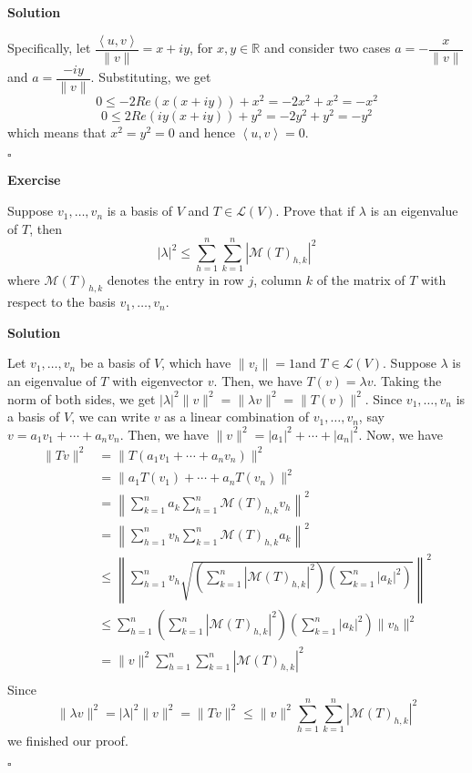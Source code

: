 \documentclass{article}
\newenvironment{exercise}{%
{\textbf{Exercise\\}
    }
}{
}
\newenvironment{solution}{%
{
    \textbf{Solution\\}
    }
}{
  \hfill $\square$ 
  \par\bigskip 
}
\newcommand{\RR}{\mathbb{R}}
\newcommand{\parameter}[1]{\left(#1\right)}
\begin{document}
\begin{CJK}{UTF8}{gkai}
\begin{solution}
    Specifically, let $\dfrac{\left<u,v\right>}{\|v\|}=x+iy$, for $x,y\in \RR$ and consider two cases $a=-\dfrac{x}{\|v\|}$ and $a = \dfrac{-iy}{\|v\|}$. Substituting, we get  
   \[0\leq -2Re(x(x+iy))+x^2=-2x^2+x^2=-x^2\]
   \[0\leq 2Re(iy(x+iy))+y^2=-2y^2+y^2=-y^2\]
    which means that $x^2=y^2=0$ and hence $\left<u,v\right>=0$.
\end{solution}

\begin{exercise}
    Suppose $v_1,\ldots,v_n$ is a basis of $V$ and $T \in \mathcal{L}(V)$. Prove that if $\lambda$ is an eigenvalue of $T$, then
    \[|\lambda|^2 \leq \sum_{h = 1}^{n}\sum_{k = 1}^{n}|\mathcal{M}(T)_{h,k}|^2\]
    where $\mathcal{M}(T)_{h,k}$ denotes the entry in row $j$, column $k$ of the matrix of $T$ with respect to the basis $v_1,\ldots,v_n$.
\end{exercise}

\begin{solution}
    Let $v_1,\ldots,v_n$ be a basis of $V$, which have $\|v_i\| = 1$and $T \in \mathcal{L}(V)$. Suppose $\lambda$ is an eigenvalue of $T$ with eigenvector $v$. Then, we have $T(v) = \lambda v$. Taking the norm of both sides, we get $|\lambda|^2 \|v\|^2 = \|\lambda v\|^2 = \|T(v)\|^2$. Since $v_1,\ldots,v_n$ is a basis of $V$, we can write $v$ as a linear combination of $v_1,\ldots,v_n$, say $v = a_1v_1 + \cdots + a_nv_n$. Then, we have $\|v\|^2 = |a_1|^2 + \cdots + |a_n|^2$. Now, we have
\begin{align*}
\|Tv\|^2 &= \|T(a_1v_1 + \cdots + a_nv_n)\|^2 \\
&= \|a_1T(v_1) + \cdots + a_nT(v_n)\|^2 \\
&=\left\| \sum_{k = 1}^{n} a_k \sum_{h = 1}^{n}\mathcal{M}(T)_{h,k} v_h\right\|^2 \\
&=\left\| \sum_{h = 1}^{n}  v_h\sum_{k = 1}^{n} \mathcal{M}(T)_{h,k}a_k \right\|^2 \\
&\leq\left\| \sum_{h = 1}^{n}  v_h\sqrt{\parameter{\sum_{k = 1}^{n} |\mathcal{M}(T)_{h,k}|^2}\parameter{\sum_{k = 1}^{n} | a_k|^2}} \right\|^2 \\
&\leq \sum_{h = 1}^{n}\parameter{\sum_{k = 1}^{n} |\mathcal{M}(T)_{h,k}|^2}\parameter{\sum_{k = 1}^{n} | a_k|^2}  \|v_h\|^2  \\
&= \|v\|^2 \sum_{h = 1}^{n}\sum_{k = 1}^{n}|\mathcal{M}(T)_{h,k}|^2\\
\end{align*}
Since
\[\|\lambda v\|^2 = |\lambda|^2 \|v\|^2 = \|Tv\|^2 \leq  \|v\|^2 \sum_{h = 1}^{n}\sum_{k = 1}^{n}|\mathcal{M}(T)_{h,k}|^2\]
we finished our proof.
\end{solution}


\end{CJK}
\end{document}
